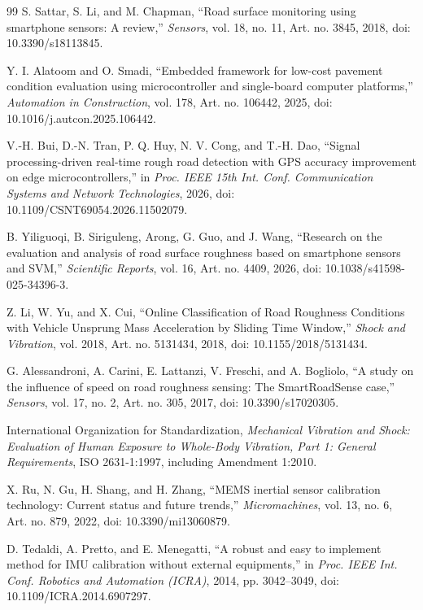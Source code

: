 \begin{thebibliography}{99}
 S. Sattar, S. Li, and M. Chapman, ``Road surface monitoring using smartphone sensors: A review,'' \emph{Sensors}, vol. 18, no. 11, Art. no. 3845, 2018, doi: 10.3390/s18113845.

 Y. I. Alatoom and O. Smadi, ``Embedded framework for low-cost pavement condition evaluation using microcontroller and single-board computer platforms,'' \emph{Automation in Construction}, vol. 178, Art. no. 106442, 2025, doi: 10.1016/j.autcon.2025.106442.

 V.-H. Bui, D.-N. Tran, P. Q. Huy, N. V. Cong, and T.-H. Dao, ``Signal processing-driven real-time rough road detection with GPS accuracy improvement on edge microcontrollers,'' in \emph{Proc. IEEE 15th Int. Conf. Communication Systems and Network Technologies}, 2026, doi: 10.1109/CSNT69054.2026.11502079.

 B. Yiliguoqi, B. Siriguleng, Arong, G. Guo, and J. Wang, ``Research on the evaluation and analysis of road surface roughness based on smartphone sensors and SVM,'' \emph{Scientific Reports}, vol. 16, Art. no. 4409, 2026, doi: 10.1038/s41598-025-34396-3.

 Z. Li, W. Yu, and X. Cui, ``Online Classification of Road Roughness Conditions with Vehicle Unsprung Mass Acceleration by Sliding Time Window,'' \emph{Shock and Vibration}, vol. 2018, Art. no. 5131434, 2018, doi: 10.1155/2018/5131434.

 G. Alessandroni, A. Carini, E. Lattanzi, V. Freschi, and A. Bogliolo, ``A study on the influence of speed on road roughness sensing: The SmartRoadSense case,'' \emph{Sensors}, vol. 17, no. 2, Art. no. 305, 2017, doi: 10.3390/s17020305.

 International Organization for Standardization, \emph{Mechanical Vibration and Shock: Evaluation of Human Exposure to Whole-Body Vibration, Part 1: General Requirements}, ISO 2631-1:1997, including Amendment 1:2010.

 X. Ru, N. Gu, H. Shang, and H. Zhang, ``MEMS inertial sensor calibration technology: Current status and future trends,'' \emph{Micromachines}, vol. 13, no. 6, Art. no. 879, 2022, doi: 10.3390/mi13060879.

 D. Tedaldi, A. Pretto, and E. Menegatti, ``A robust and easy to implement method for IMU calibration without external equipments,'' in \emph{Proc. IEEE Int. Conf. Robotics and Automation (ICRA)}, 2014, pp. 3042--3049, doi: 10.1109/ICRA.2014.6907297.


\end{thebibliography}
